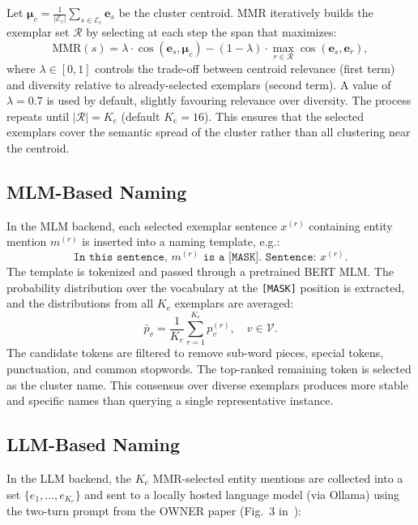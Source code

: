 \documentclass[14pt]{extreport}
\begin{document}
Let $\boldsymbol{\mu}_c = \frac{1}{|\mathcal{E}_c|}\sum_{s \in \mathcal{E}_c} \mathbf{e}_s$ be the cluster centroid. MMR iteratively builds the exemplar set $\mathcal{R}$ by selecting at each step the span that maximizes:
\begin{equation}
    \text{MMR}(s) = \lambda \cdot \cos(\mathbf{e}_s, \boldsymbol{\mu}_c) - (1-\lambda) \cdot \max_{r \in \mathcal{R}} \cos(\mathbf{e}_s, \mathbf{e}_r),
    \label{eq:mmr}
\end{equation}
where $\lambda \in [0, 1]$ controls the trade-off between centroid relevance (first term) and diversity relative to already-selected exemplars (second term). A value of $\lambda = 0.7$ is used by default, slightly favouring relevance over diversity. The process repeats until $|\mathcal{R}| = K_e$ (default $K_e = 16$). This ensures that the selected exemplars cover the semantic spread of the cluster rather than all clustering near the centroid.

\subsection{MLM-Based Naming}

In the MLM backend, each selected exemplar sentence $x^{(r)}$ containing entity mention $m^{(r)}$ is inserted into a naming template, e.g.:
\begin{equation*}
    \texttt{In this sentence, } m^{(r)} \texttt{ is a [MASK]. Sentence: } x^{(r)}.
\end{equation*}
The template is tokenized and passed through a pretrained BERT MLM. The probability distribution over the vocabulary at the \texttt{[MASK]} position is extracted, and the distributions from all $K_e$ exemplars are averaged:
\begin{equation}
    \bar{p}_v = \frac{1}{K_e} \sum_{r=1}^{K_e} p_v^{(r)}, \quad v \in \mathcal{V}.
    \label{eq:mlm_avg}
\end{equation}
The candidate tokens are filtered to remove sub-word pieces, special tokens, punctuation, and common stopwords. The top-ranked remaining token is selected as the cluster name. This consensus over diverse exemplars produces more stable and specific names than querying a single representative instance.

\subsection{LLM-Based Naming}

In the LLM backend, the $K_e$ MMR-selected entity mentions are collected into a set $\{e_1, \ldots, e_{K_e}\}$ and sent to a locally hosted language model (via Ollama) using the two-turn prompt from the OWNER paper (Fig.~3 in~\cite{wang-etal-2023-crossner}):
\end{document}
